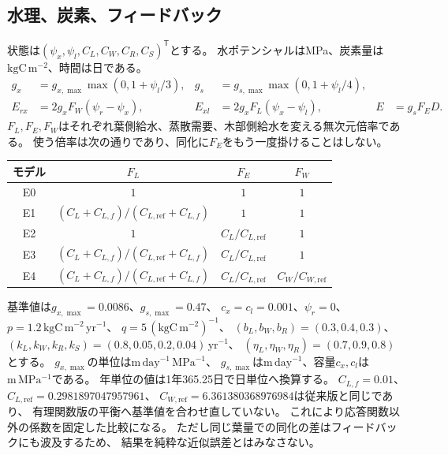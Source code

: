 \documentclass[a4paper,11pt]{ltjsarticle}
\newcommand{\tr}{^{\mathsf T}}
\begin{document}
\subsection{水理、炭素、フィードバック}
状態は$(\psi_x,\psi_l,C_L,C_W,C_R,C_S)\tr$とする。
水ポテンシャルはMPa、炭素量は$\mathrm{kgC\,m^{-2}}$、時間は日である。
\begin{align}
 g_x&=g_{x,\max}\max(0,1+\psi_l/3),&
 g_s&=g_{s,\max}\max(0,1+\psi_l/4),\\
 E_{rx}&=2g_x F_W(\psi_r-\psi_x),&
 E_{xl}&=2g_x F_L(\psi_x-\psi_l),&
 E&=g_s F_E D .
\end{align}
$F_L,F_E,F_W$はそれぞれ葉側給水、蒸散需要、木部側給水を変える無次元倍率である。
使う倍率は次の通りであり、同化に$F_E$をもう一度掛けることはしない。
\begin{center}
\begin{tabular}{c c c c}\toprule
モデル&$F_L$&$F_E$&$F_W$\\\midrule
E0&$1$&$1$&$1$\\
E1&$(C_L+C_{L,f})/(C_{L,\mathrm{ref}}+C_{L,f})$&$1$&$1$\\
E2&$1$&$C_L/C_{L,\mathrm{ref}}$&$1$\\
E3&$(C_L+C_{L,f})/(C_{L,\mathrm{ref}}+C_{L,f})$&$C_L/C_{L,\mathrm{ref}}$&$1$\\
E4&$(C_L+C_{L,f})/(C_{L,\mathrm{ref}}+C_{L,f})$&$C_L/C_{L,\mathrm{ref}}$&$C_W/C_{W,\mathrm{ref}}$\\
\bottomrule\end{tabular}
\end{center}
基準値は$g_{x,\max}=0.0086$、$g_{s,\max}=0.47$、
$c_x=c_l=0.001$、$\psi_r=0$、$p=1.2\,\mathrm{kgC\,m^{-2}\,yr^{-1}}$、
$q=5\,(\mathrm{kgC\,m^{-2}})^{-1}$、
$(b_L,b_W,b_R)=(0.3,0.4,0.3)$、
$(k_L,k_W,k_R,k_S)=(0.8,0.05,0.2,0.04)\,\mathrm{yr^{-1}}$、
$(\eta_L,\eta_W,\eta_R)=(0.7,0.9,0.8)$とする。
$g_{x,\max}$の単位は$\mathrm{m\,day^{-1}\,MPa^{-1}}$、
$g_{s,\max}$は$\mathrm{m\,day^{-1}}$、容量$c_x,c_l$は$\mathrm{m\,MPa^{-1}}$である。
年単位の値は1年365.25日で日単位へ換算する。
$C_{L,f}=0.01$、$C_{L,\mathrm{ref}}=0.2981897047957961$、
$C_{W,\mathrm{ref}}=6.361380368976984$は従来版と同じであり、
有理関数版の平衡へ基準値を合わせ直していない。
これにより応答関数以外の係数を固定した比較になる。
ただし同じ葉量での同化の差はフィードバックにも波及するため、
結果を純粋な近似誤差とはみなさない。
\end{document}
